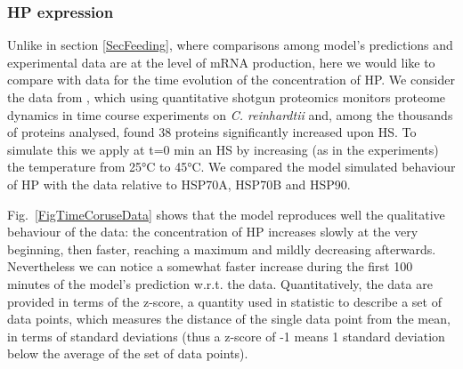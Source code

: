 \documentclass[oneside, 10pt, a4paper, twocolumn]{article}
\begin{document}





\subsubsection{HP expression}
\label{SecTimeCurse}

Unlike in section \ref{SecFeeding}, where comparisons among model's predictions and experimental data are at the level of mRNA production, here we would like to compare with data for the time evolution of the concentration of HP. We consider the data from \cite{Muehlhaus2011}, which using quantitative shotgun proteomics monitors proteome dynamics in time course experiments on \emph{C. reinhardtii} and, among the thousands of proteins analysed, found 38 proteins significantly increased upon HS. To simulate this we apply at t=$0$ min an HS by increasing (as in the experiments) the temperature from 25°C to 45°C. We compared the model simulated behaviour of HP with the data relative to HSP70A, HSP70B and HSP90.  

Fig.~\ref{FigTimeCoruseData} shows that the model reproduces well the qualitative behaviour of the data: the concentration of HP increases slowly at the very beginning, then faster, reaching a maximum and mildly decreasing afterwards. Nevertheless we can notice a somewhat faster increase during the first 100 minutes of the model's prediction w.r.t. the data. Quantitatively, the data are provided in terms of the z-score, a quantity used in statistic to describe a set of data points, which measures the distance of the single data point from the mean, in terms of standard deviations (thus a z-score of -1 means 1 standard deviation below the average of the set of data points). 
\end{document}
